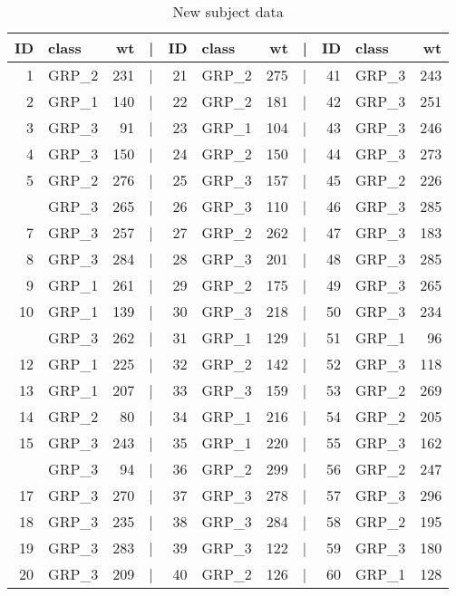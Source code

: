 \documentclass[smallextended]{svjour3}       %
\begin{document}
\begin{table}

\caption{\label{tab:new-data}New subject data}
\centering
\begin{tabular}[t]{rlrlrlrlrlr}
\toprule
ID & class & wt & | & ID & class & wt & | & ID & class & wt\\
\midrule
1 & GRP\_2 & 231 & | & 21 & GRP\_2 & 275 & | & 41 & GRP\_3 & 243\\
2 & GRP\_1 & 140 & | & 22 & GRP\_2 & 181 & | & 42 & GRP\_3 & 251\\
3 & GRP\_3 & 91 & | & 23 & GRP\_1 & 104 & | & 43 & GRP\_3 & 246\\
4 & GRP\_3 & 150 & | & 24 & GRP\_2 & 150 & | & 44 & GRP\_3 & 273\\
5 & GRP\_2 & 276 & | & 25 & GRP\_3 & 157 & | & 45 & GRP\_2 & 226\\
\addlinespace
6 & GRP\_3 & 265 & | & 26 & GRP\_3 & 110 & | & 46 & GRP\_3 & 285\\
7 & GRP\_3 & 257 & | & 27 & GRP\_2 & 262 & | & 47 & GRP\_3 & 183\\
8 & GRP\_3 & 284 & | & 28 & GRP\_3 & 201 & | & 48 & GRP\_3 & 285\\
9 & GRP\_1 & 261 & | & 29 & GRP\_2 & 175 & | & 49 & GRP\_3 & 265\\
10 & GRP\_1 & 139 & | & 30 & GRP\_3 & 218 & | & 50 & GRP\_3 & 234\\
\addlinespace
11 & GRP\_3 & 262 & | & 31 & GRP\_1 & 129 & | & 51 & GRP\_1 & 96\\
12 & GRP\_1 & 225 & | & 32 & GRP\_2 & 142 & | & 52 & GRP\_3 & 118\\
13 & GRP\_1 & 207 & | & 33 & GRP\_3 & 159 & | & 53 & GRP\_2 & 269\\
14 & GRP\_2 & 80 & | & 34 & GRP\_1 & 216 & | & 54 & GRP\_2 & 205\\
15 & GRP\_3 & 243 & | & 35 & GRP\_1 & 220 & | & 55 & GRP\_3 & 162\\
\addlinespace
16 & GRP\_3 & 94 & | & 36 & GRP\_2 & 299 & | & 56 & GRP\_2 & 247\\
17 & GRP\_3 & 270 & | & 37 & GRP\_3 & 278 & | & 57 & GRP\_3 & 296\\
18 & GRP\_3 & 235 & | & 38 & GRP\_3 & 284 & | & 58 & GRP\_2 & 195\\
19 & GRP\_3 & 283 & | & 39 & GRP\_3 & 122 & | & 59 & GRP\_3 & 180\\
20 & GRP\_3 & 209 & | & 40 & GRP\_2 & 126 & | & 60 & GRP\_1 & 128\\
\bottomrule
\end{tabular}
\end{table}
\end{document}
